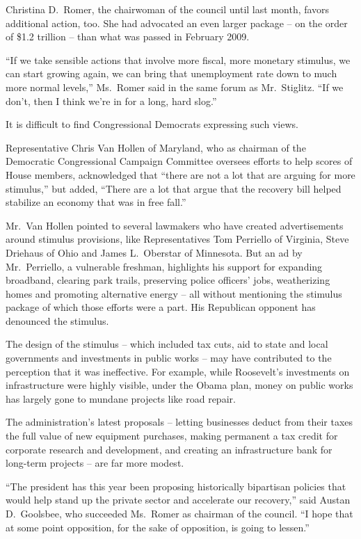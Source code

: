 ﻿\documentclass[12pt]{article}
\begin{document}
Christina D.~Romer, the chairwoman of the council until last month, favors additional action, too.
She had advocated an even larger package -- on the order of \$1.2 trillion -- than what was passed
in February 2009.

``If we take sensible actions that involve more fiscal, more monetary stimulus, we can start growing
again, we can bring that unemployment rate down to much more normal levels,'' Ms.~Romer said in the
same forum as Mr.~Stiglitz. ``If we don't, then I think we're in for a long, hard slog.''

It is difficult to find Congressional Democrats expressing such views.

Representative Chris Van Hollen of Maryland, who as chairman of the Democratic Congressional
Campaign Committee oversees efforts to help scores of House members, acknowledged that ``there are
not a lot that are arguing for more stimulus,'' but added, ``There are a lot that argue that the
recovery bill helped stabilize an economy that was in free fall.''

Mr.~Van Hollen pointed to several lawmakers who have created advertisements around stimulus
provisions, like Representatives Tom Perriello of Virginia, Steve Driehaus of Ohio and James
L.~Oberstar of Minnesota. But an ad by Mr.~Perriello, a vulnerable freshman, highlights his support
for expanding broadband, clearing park trails, preserving police officers' jobs, weatherizing homes
and promoting alternative energy -- all without mentioning the stimulus package of which those
efforts were a part. His Republican opponent has denounced the stimulus.

The design of the stimulus -- which included tax cuts, aid to state and local governments and
investments in public works -- may have contributed to the perception that it was ineffective. For
example, while Roosevelt's investments on infrastructure were highly visible, under the Obama plan,
money on public works has largely gone to mundane projects like road repair.

The administration's latest proposals -- letting businesses deduct from their taxes the full value
of new equipment purchases, making permanent a tax credit for corporate research and development,
and creating an infrastructure bank for long-term projects -- are far more modest.

``The president has this year been proposing historically bipartisan policies that would help stand
up the private sector and accelerate our recovery,'' said Austan D.~Goolsbee, who succeeded
Ms.~Romer as chairman of the council. ``I hope that at some point opposition, for the sake of
opposition, is going to lessen.''
\end{document}
